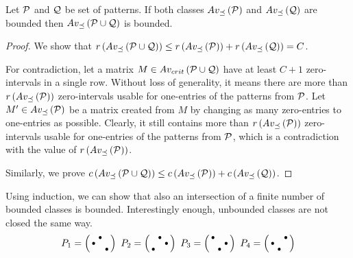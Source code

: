 \begin{thm}
\label{thm:boundunion}
Let $\mathcal{P}$ and $\mathcal{Q}$ be set of patterns. If both classes $Av_{\preceq}\left(\mathcal{P}\right)$ and $Av_{\preceq}\left(\mathcal{Q}\right)$ are bounded then $Av_{\preceq}\left(\mathcal{P}\cup\mathcal{Q}\right)$ is bounded.
\end{thm}
\begin{proof}
We show that $r\left(Av_{\preceq}\left(\mathcal{P}\cup\mathcal{Q}\right)\right)\leq r\left(Av_{\preceq}\left(\mathcal{P}\right)\right)+r\left(Av_{\preceq}\left(\mathcal{Q}\right)\right)=C$.

For contradiction, let a matrix $M\in Av_{crit}\left(\mathcal{P}\cup\mathcal{Q}\right)$ have at least $C+1$ zero-intervals in a single row. Without loss of generality, it means there are more than $r\left(Av_{\preceq}\left(\mathcal{P}\right)\right)$ zero-intervals usable for one-entries of the patterns from $\mathcal{P}$. Let $M'\in Av_{\preceq}\left(\mathcal{P}\right)$ be a matrix created from $M$ by changing as many zero-entries to one-entries as possible. Clearly, it still contains more than $r\left(Av_{\preceq}\left(\mathcal{P}\right)\right)$ zero-intervals usable for one-entries of the patterns from $\mathcal{P}$, which is a contradiction with the value of $r\left(Av_{\preceq}\left(\mathcal{P}\right)\right)$.

Similarly, we prove $c\left(Av_{\preceq}\left(\mathcal{P}\cup\mathcal{Q}\right)\right)\leq c\left(Av_{\preceq}\left(\mathcal{P}\right)\right)+c\left(Av_{\preceq}\left(\mathcal{Q}\right)\right)$.
\end{proof}

Using induction, we can show that also an intersection of a finite number of bounded classes is bounded. Interestingly enough, unbounded classes are not closed the same way.
$$P_1=\left(\begin{smallmatrix} &\bullet& \\\bullet& & \\ & &\bullet\end{smallmatrix}\right)\ P_2=\left(\begin{smallmatrix} &\bullet& \\ & &\bullet\\\bullet& & \end{smallmatrix}\right)\ P_3=\left(\begin{smallmatrix}\bullet& & \\ & &\bullet\\ &\bullet& \end{smallmatrix}\right)\ P_4=\left(\begin{smallmatrix} & &\bullet\\\bullet& & \\ &\bullet& \end{smallmatrix}\right)$$

